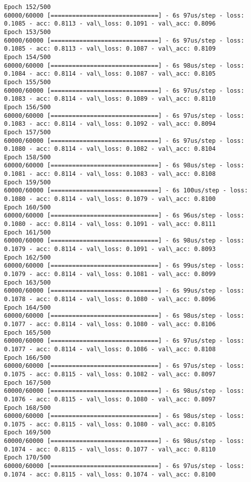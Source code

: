 \documentclass[11pt]{article}
\begin{document}
\begin{Verbatim}[commandchars=\\\{\}]
Epoch 152/500
60000/60000 [==============================] - 6s 97us/step - loss: 0.1085 - acc: 0.8113 - val\_loss: 0.1091 - val\_acc: 0.8096
Epoch 153/500
60000/60000 [==============================] - 6s 97us/step - loss: 0.1085 - acc: 0.8113 - val\_loss: 0.1087 - val\_acc: 0.8109
Epoch 154/500
60000/60000 [==============================] - 6s 98us/step - loss: 0.1084 - acc: 0.8114 - val\_loss: 0.1087 - val\_acc: 0.8105
Epoch 155/500
60000/60000 [==============================] - 6s 97us/step - loss: 0.1083 - acc: 0.8114 - val\_loss: 0.1089 - val\_acc: 0.8110
Epoch 156/500
60000/60000 [==============================] - 6s 97us/step - loss: 0.1083 - acc: 0.8114 - val\_loss: 0.1092 - val\_acc: 0.8094
Epoch 157/500
60000/60000 [==============================] - 6s 97us/step - loss: 0.1080 - acc: 0.8114 - val\_loss: 0.1082 - val\_acc: 0.8104
Epoch 158/500
60000/60000 [==============================] - 6s 98us/step - loss: 0.1081 - acc: 0.8114 - val\_loss: 0.1083 - val\_acc: 0.8108
Epoch 159/500
60000/60000 [==============================] - 6s 100us/step - loss: 0.1080 - acc: 0.8114 - val\_loss: 0.1079 - val\_acc: 0.8100
Epoch 160/500
60000/60000 [==============================] - 6s 96us/step - loss: 0.1080 - acc: 0.8114 - val\_loss: 0.1091 - val\_acc: 0.8111
Epoch 161/500
60000/60000 [==============================] - 6s 98us/step - loss: 0.1079 - acc: 0.8114 - val\_loss: 0.1091 - val\_acc: 0.8093
Epoch 162/500
60000/60000 [==============================] - 6s 99us/step - loss: 0.1079 - acc: 0.8114 - val\_loss: 0.1081 - val\_acc: 0.8099
Epoch 163/500
60000/60000 [==============================] - 6s 99us/step - loss: 0.1078 - acc: 0.8114 - val\_loss: 0.1080 - val\_acc: 0.8096
Epoch 164/500
60000/60000 [==============================] - 6s 98us/step - loss: 0.1077 - acc: 0.8114 - val\_loss: 0.1080 - val\_acc: 0.8106
Epoch 165/500
60000/60000 [==============================] - 6s 97us/step - loss: 0.1077 - acc: 0.8114 - val\_loss: 0.1086 - val\_acc: 0.8108
Epoch 166/500
60000/60000 [==============================] - 6s 97us/step - loss: 0.1075 - acc: 0.8115 - val\_loss: 0.1082 - val\_acc: 0.8097
Epoch 167/500
60000/60000 [==============================] - 6s 98us/step - loss: 0.1076 - acc: 0.8115 - val\_loss: 0.1080 - val\_acc: 0.8097
Epoch 168/500
60000/60000 [==============================] - 6s 98us/step - loss: 0.1075 - acc: 0.8115 - val\_loss: 0.1080 - val\_acc: 0.8105
Epoch 169/500
60000/60000 [==============================] - 6s 98us/step - loss: 0.1074 - acc: 0.8115 - val\_loss: 0.1077 - val\_acc: 0.8110
Epoch 170/500
60000/60000 [==============================] - 6s 97us/step - loss: 0.1074 - acc: 0.8115 - val\_loss: 0.1074 - val\_acc: 0.8100

\end{Verbatim}
\end{document}
